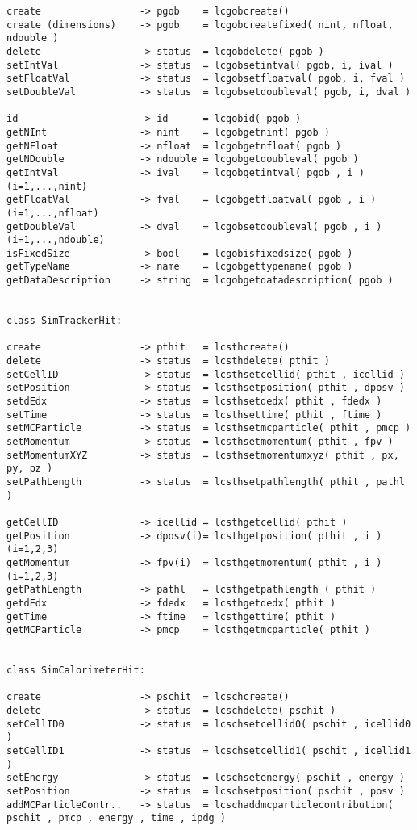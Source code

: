 \begin{scriptsize}
\begin{verbatim}
create                 -> pgob    = lcgobcreate()
create (dimensions)    -> pgob    = lcgobcreatefixed( nint, nfloat, ndouble )
delete                 -> status  = lcgobdelete( pgob )
setIntVal              -> status  = lcgobsetintval( pgob, i, ival )
setFloatVal            -> status  = lcgobsetfloatval( pgob, i, fval )
setDoubleVal           -> status  = lcgobsetdoubleval( pgob, i, dval )

id                     -> id      = lcgobid( pgob )
getNInt                -> nint    = lcgobgetnint( pgob )
getNFloat              -> nfloat  = lcgobgetnfloat( pgob )
getNDouble             -> ndouble = lcgobgetdoubleval( pgob )
getIntVal              -> ival    = lcgobgetintval( pgob , i )      (i=1,...,nint)
getFloatVal            -> fval    = lcgobgetfloatval( pgob , i )    (i=1,...,nfloat)
getDoubleVal           -> dval    = lcgobsetdoubleval( pgob , i )   (i=1,...,ndouble)
isFixedSize            -> bool    = lcgobisfixedsize( pgob )
getTypeName            -> name    = lcgobgettypename( pgob )
getDataDescription     -> string  = lcgobgetdatadescription( pgob )


class SimTrackerHit:

create                 -> pthit   = lcsthcreate()
delete                 -> status  = lcsthdelete( pthit )
setCellID              -> status  = lcsthsetcellid( pthit , icellid )
setPosition            -> status  = lcsthsetposition( pthit , dposv )
setdEdx                -> status  = lcsthsetdedx( pthit , fdedx )
setTime                -> status  = lcsthsettime( pthit , ftime )
setMCParticle          -> status  = lcsthsetmcparticle( pthit , pmcp )
setMomentum            -> status  = lcsthsetmomentum( pthit , fpv )
setMomentumXYZ         -> status  = lcsthsetmomentumxyz( pthit , px, py, pz )
setPathLength          -> status  = lcsthsetpathlength( pthit , pathl )

getCellID              -> icellid = lcsthgetcellid( pthit )
getPosition            -> dposv(i)= lcsthgetposition( pthit , i ) (i=1,2,3)
getMomentum            -> fpv(i)  = lcsthgetmomentum( pthit , i ) (i=1,2,3)
getPathLength          -> pathl   = lcsthgetpathlength ( pthit )
getdEdx                -> fdedx   = lcsthgetdedx( pthit )
getTime                -> ftime   = lcsthgettime( pthit )
getMCParticle          -> pmcp    = lcsthgetmcparticle( pthit )


class SimCalorimeterHit:

create                 -> pschit  = lcschcreate()
delete                 -> status  = lcschdelete( pschit )
setCellID0             -> status  = lcschsetcellid0( pschit , icellid0 )
setCellID1             -> status  = lcschsetcellid1( pschit , icellid1 )
setEnergy              -> status  = lcschsetenergy( pschit , energy )
setPosition            -> status  = lcschsetposition( pschit , posv )
addMCParticleContr..   -> status  = lcschaddmcparticlecontribution( pschit , pmcp , energy , time , ipdg )


\end{verbatim}
\end{scriptsize}
